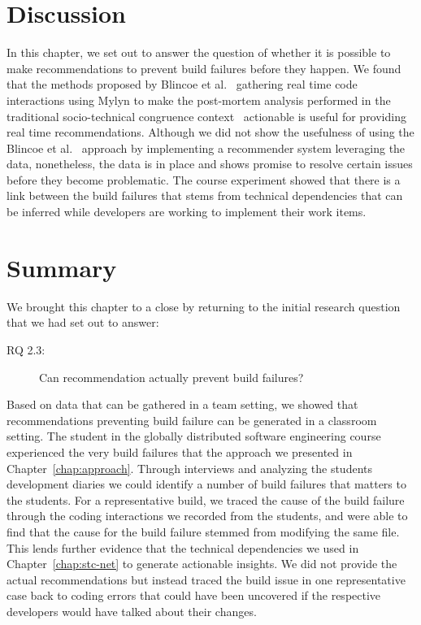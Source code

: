 \section{Discussion}
\label{ch10:dis}
In this chapter, we set out to answer the question of whether it is possible to make recommendations to prevent build failures before they happen.
We found that the methods proposed by Blincoe et al.~\cite{blincoe:cscw:2012} gathering real time code interactions using Mylyn to make the post-mortem analysis performed in the traditional socio-technical congruence context~\cite{kersten:aosd:2005} actionable is useful for providing real time recommendations.
Although we did not show the usefulness of using the Blincoe et al.~\cite{blincoe:cscw:2012} approach by implementing a recommender system leveraging the data, nonetheless, the data is in place and shows promise to resolve certain issues before they become problematic.
The course experiment showed that there is a link between the build failures that stems from technical dependencies that can be inferred while developers are working to implement their work items.

\section{Summary}
\label{ch10:con}
We brought this chapter to a close by returning to the initial research question that we had set out to answer:
\begin{description}
  \item[RQ 2.3:] Can recommendation actually prevent build failures?
\end{description}

Based on data that can be gathered in a team setting, we showed that recommendations preventing build failure can be generated in a classroom setting.
The student in the globally distributed software engineering course experienced the very build failures that the approach we presented in Chapter~\ref{chap:approach}.
Through interviews and analyzing the students development diaries we could identify a number of build failures that matters to the students.
For a representative build, we traced the cause of the build failure through the coding interactions we recorded from the students, and were able to  find that the cause for the build failure stemmed from modifying the same file.
This lends further evidence that the technical dependencies we used in Chapter~\ref{chap:stc-net} to generate actionable insights.
%
We did not provide the actual recommendations but instead traced the build issue in one representative case back to coding errors that could have been uncovered if the respective developers would have talked about their changes.